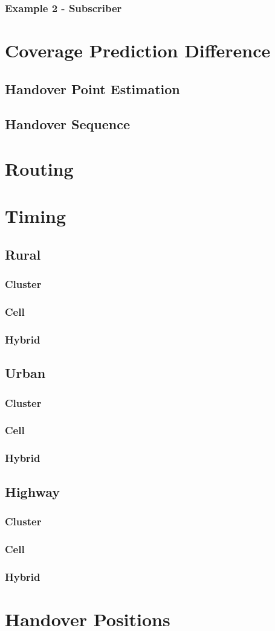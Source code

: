 \subsubsection{Example 2 - Subscriber }
\section{Coverage Prediction Difference}
\subsection{Handover Point Estimation}
\subsection{Handover Sequence}
\section{Routing}
\section{Timing}
\subsection{Rural}
\subsubsection{Cluster}
\subsubsection{Cell}
\subsubsection{Hybrid}
\subsection{Urban}
\subsubsection{Cluster}
\subsubsection{Cell}
\subsubsection{Hybrid}
\subsection{Highway}
\subsubsection{Cluster}
\subsubsection{Cell}
\subsubsection{Hybrid}
\section{Handover Positions}